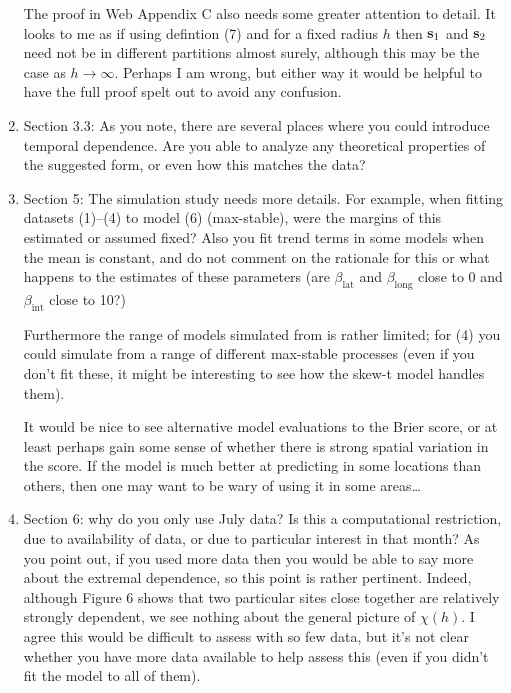 \documentclass[11pt]{article}
\begin{document}
\begin{enumerate}[1.]
  The proof in Web Appendix C also needs some greater attention to detail. It looks to me as if using defintion (7) and for a fixed radius $h$ then $\mbox{\bf s}_1$ and $\mbox{\bf s}_2$ need not be in different partitions almost surely, although this may be the case as $h \rightarrow \infty$. Perhaps I am wrong, but either way it would be helpful to have the full proof spelt out to avoid any confusion.

  \item Section 3.3: As you note, there are several places where you could introduce temporal dependence. Are you able to analyze any theoretical properties of the suggested form, or even how this matches the data?

  \item Section 5: The simulation study needs more details. For example, when fitting datasets (1)--(4) to model (6) (max-stable), were the margins of this estimated or assumed fixed? Also you fit trend terms in some models when the mean is constant, and do not comment on the rationale for this or what happens to the estimates of these parameters (are $\beta_\text{lat}$ and $\beta_\text{long}$ close to 0 and $\beta_\text{int}$ close to 10?)

  Furthermore the range of models simulated from is rather limited; for (4) you could simulate from a range of different max-stable processes (even if you don’t fit these, it might be interesting to see how the skew-t model handles them).

  It would be nice to see alternative model evaluations to the Brier score, or at least perhaps gain some sense of whether there is strong spatial variation in the score. If the model is much better at predicting in some locations than others, then one may want to be wary of using it in some areas\ldots

  \item Section 6: why do you only use July data? Is this a computational restriction, due to availability of data, or due to particular interest in that month? As you point out, if you used more data then you would be able to say more about the extremal dependence, so this point is rather pertinent. Indeed, although Figure 6 shows that two particular sites close together are relatively strongly dependent, we see nothing about the general picture of $\chi(h)$. I agree this would be difficult to assess with so few data, but it’s not clear whether you have more data available to help assess this (even if you didn’t fit the model to all of them).
\end{enumerate}
\end{document}
